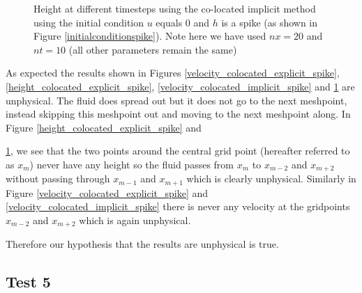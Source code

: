 \documentclass[a4paper,12pt, notitlepage]{article}
\begin{document}
\begin{figure} [H]
\begin{minipage}{.5\textwidth}
		\caption{\label{height_colocated_implicit_spike} Height at different timesteps using the co-located implicit method using the initial condition $u$ equals 0 and $h$ is a spike (as shown in Figure \ref{initialconditionspike}). Note here we have used $nx = 20$ and $nt = 10$ (all other parameters remain the same)} 
	\end{minipage}
\end{figure}

As expected the results shown in Figures \ref{velocity_colocated_explicit_spike}, \ref{height_colocated_explicit_spike}, \ref{velocity_colocated_implicit_spike} and \ref{height_colocated_implicit_spike} are unphysical. The fluid does spread out but it does not go to the next meshpoint, instead skipping this meshpoint out and moving to the next meshpoint along. In Figure \ref{height_colocated_explicit_spike} and {\ref{height_colocated_implicit_spike}, we see that the two points around the central grid point (hereafter referred to as $x_{m}$) never have any height so the fluid passes from $x_{m}$ to $x_{m-2}$ and $x_{m+ 2}$ without passing through $x_{m-1}$ and $x_{m+1}$ which is clearly unphysical. Similarly in Figure \ref{velocity_colocated_explicit_spike} and \ref{velocity_colocated_implicit_spike} there is never any velocity at the gridpoints $x_{m-2}$ and $x_{m+2}$ which is again unphysical. 
	
Therefore our hypothesis that the results are unphysical is true.

\subsection{Test 5}

}
\end{document}
